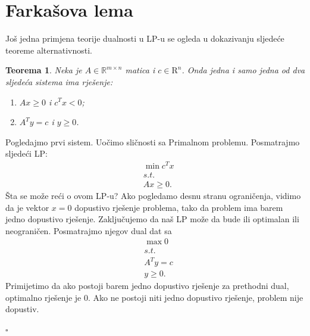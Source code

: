 \documentclass[a4paper, utf8, 11pt, colorlinks]{book}
\newtheorem{thm}{Teorema}
\newenvironment{proof}{{Dokaz:}}{\hfill$\square$}
\begin{document}
\section{Farkašova lema}
Još jedna primjena teorije dualnosti u LP-u se ogleda u dokazivanju sljedeće teoreme alternativnosti.

\begin{thm}
	Neka je $A\in \mathbb{R}^{m \times n}$ matica i $c\in \mathrm{R}^n$. Onda jedna i samo jedna od dva sljedeća sistema ima rješenje:
	\begin{enumerate}
		\item  $Ax \geq 0$  i $c^T x < 0$; \label{case:1}
		\item $A^T y = c$ i $y \geq 0$. \label{case:2}
	\end{enumerate}
\end{thm}
\begin{proof}
	  Pogledajmo prvi sistem. Uočimo sličnosti sa Primalnom problemu. Posmatrajmo sljedeći LP:
	  \begin{align*}
	  	 &\min c^T x \\
	  	 &s.t. \\
	  	 & A x \geq 0.
	  \end{align*}
  Šta se može reći o ovom LP-u? Ako pogledamo desnu stranu ograničenja, vidimo da je vektor $x = 0$ 
  dopustivo rješenje problema, tako da problem ima barem jedno dopustivo rješenje. Zaključujemo da naš LP može da bude ili optimalan ili neograničen. Posmatrajmo njegov dual   dat sa 
  \begin{align*}
  	   &\max 0 \\
  	   &s.t. \\
  	   & A^T y  = c \\
  	   & y \geq 0.
  \end{align*}
  Primijetimo da ako postoji barem jedno dopustivo rješenje za prethodni dual, optimalno rješenje je 0. Ako ne postoji niti jedno dopustivo rješenje, problem nije dopustiv. 
  

\end{proof}
\end{document}
